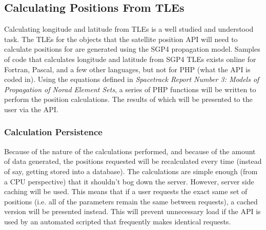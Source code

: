 \documentclass{mxl-note}
\begin{document}
\subsection{Calculating Positions From TLEs}
Calculating longitude and latitude from TLEs is a well studied and understood task. The TLEs for the objects that the satellite position API will need to calculate positions for are generated using the SGP4 propagation model. Samples of code that calculates longitude and latitude from SGP4 TLEs exists online for Fortran, Pascal, and a few other languages, but not for PHP (what the API is coded in). Using the equations defined in \textit{Spacetrack Report Number 3: Models of Propagation of Norad Element Sets}, a series of PHP functions will be written to perform the position calculations. The results of which will be presented to the user via the API. 

\subsubsection{Calculation Persistence}
Because of the nature of the calculations performed, and because of the amount of data generated, the positions requested will be recalculated every time (instead of say, getting stored into a database). The calculations are simple enough (from a CPU perspective) that it shouldn't bog down the server. However, server side caching will be used. This means that if a user requests the exact same set of positions (i.e. all of the parameters remain the same between requests), a cached version will be presented instead. This will prevent unnecessary load if the API is used by an automated scripted that frequently makes identical requests. 
\end{document}
